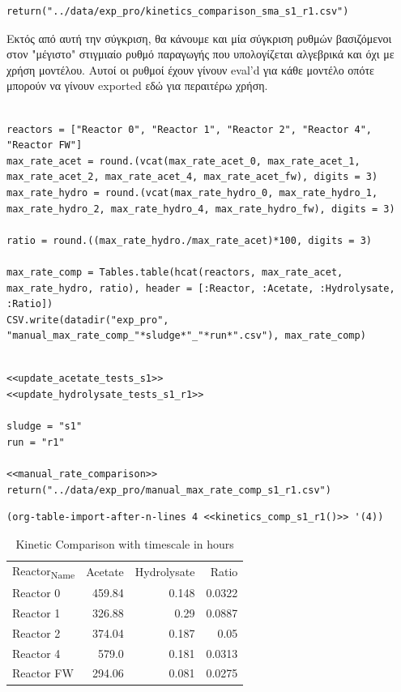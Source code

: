 \documentclass[11pt]{article}
\begin{document}
\begin{verbatim}
return("../data/exp_pro/kinetics_comparison_sma_s1_r1.csv")
\end{verbatim}

Εκτός από αυτή την σύγκριση, θα κάνουμε και μία σύγκριση ρυθμών βασιζόμενοι στον "μέγιστο" στιγμιαίο ρυθμό παραγωγής που υπολογίζεται αλγεβρικά και όχι με χρήση μοντέλου. Αυτοί οι ρυθμοί έχουν γίνουν eval'd για κάθε μοντέλο οπότε μπορούν να γίνουν exported εδώ για περαιτέρω χρήση.

\begin{verbatim}

reactors = ["Reactor 0", "Reactor 1", "Reactor 2", "Reactor 4", "Reactor FW"]
max_rate_acet = round.(vcat(max_rate_acet_0, max_rate_acet_1, max_rate_acet_2, max_rate_acet_4, max_rate_acet_fw), digits = 3)
max_rate_hydro = round.(vcat(max_rate_hydro_0, max_rate_hydro_1, max_rate_hydro_2, max_rate_hydro_4, max_rate_hydro_fw), digits = 3)

ratio = round.((max_rate_hydro./max_rate_acet)*100, digits = 3)

max_rate_comp = Tables.table(hcat(reactors, max_rate_acet, max_rate_hydro, ratio), header = [:Reactor, :Acetate, :Hydrolysate, :Ratio])
CSV.write(datadir("exp_pro", "manual_max_rate_comp_"*sludge*"_"*run*".csv"), max_rate_comp)
\end{verbatim}

\begin{verbatim}

<<update_acetate_tests_s1>>
<<update_hydrolysate_tests_s1_r1>>

sludge = "s1"
run = "r1"

<<manual_rate_comparison>>
return("../data/exp_pro/manual_max_rate_comp_s1_r1.csv")
\end{verbatim}

\begin{verbatim}
(org-table-import-after-n-lines 4 <<kinetics_comp_s1_r1()>> '(4))
\end{verbatim}

\begin{table}[htbp]
\caption{Kinetic Comparison with timescale in hours}
\centering
\begin{tabular}{lrrr}
Reactor\textsubscript{Name} & Acetate & Hydrolysate & Ratio\\[0pt]
Reactor 0 & 459.84 & 0.148 & 0.0322\\[0pt]
Reactor 1 & 326.88 & 0.29 & 0.0887\\[0pt]
Reactor 2 & 374.04 & 0.187 & 0.05\\[0pt]
Reactor 4 & 579.0 & 0.181 & 0.0313\\[0pt]
Reactor FW & 294.06 & 0.081 & 0.0275\\[0pt]
\end{tabular}
\end{table}
\end{document}
